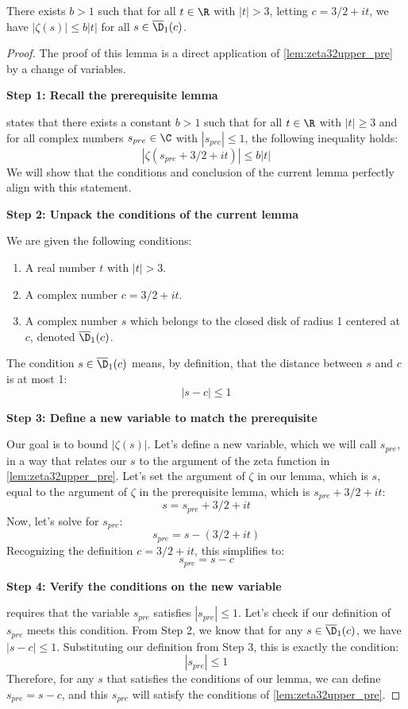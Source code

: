 \begin{lemma}\label{lem:zeta32upper}
 \leanok
There exists $b>1$ such that for all $t\in\R$ with $|t|>3$, letting $c=3/2+it$, we have $|\zeta(s)| \le b|t|$ for all $s\in\overline{\D}_1(c)$.
\end{lemma}
\begin{proof}
\leanok
{}
The proof of this lemma is a direct application of \cref{lem:zeta32upper_pre} by a change of variables.

\textbf{Step 1: Recall the prerequisite lemma}

 states that there exists a constant $b>1$ such that for all $t\in\R$ with $|t|\ge3$ and for all complex numbers $s_{pre}\in\C$ with $|s_{pre}|\le 1$, the following inequality holds:
$$ |\zeta(s_{pre}+3/2+it)| \le b|t| $$
We will show that the conditions and conclusion of the current lemma perfectly align with this statement.

\textbf{Step 2: Unpack the conditions of the current lemma}

We are given the following conditions:
\begin{enumerate}
    \item A real number $t$ with $|t| > 3$.
    \item A complex number $c = 3/2 + it$.
    \item A complex number $s$ which belongs to the closed disk of radius 1 centered at $c$, denoted $\overline{\D}_1(c)$.
\end{enumerate}
The condition $s \in \overline{\D}_1(c)$ means, by definition, that the distance between $s$ and $c$ is at most 1:
$$ |s - c| \le 1 $$

\textbf{Step 3: Define a new variable to match the prerequisite}

Our goal is to bound $|\zeta(s)|$. Let's define a new variable, which we will call $s_{pre}$, in a way that relates our $s$ to the argument of the zeta function in \cref{lem:zeta32upper_pre}.
Let's set the argument of $\zeta$ in our lemma, which is $s$, equal to the argument of $\zeta$ in the prerequisite lemma, which is $s_{pre}+3/2+it$:
$$ s = s_{pre} + 3/2 + it $$
Now, let's solve for $s_{pre}$:
$$ s_{pre} = s - (3/2 + it) $$
Recognizing the definition $c=3/2+it$, this simplifies to:
$$ s_{pre} = s - c $$

\textbf{Step 4: Verify the conditions on the new variable}

 requires that the variable $s_{pre}$ satisfies $|s_{pre}| \le 1$. Let's check if our definition of $s_{pre}$ meets this condition.
From Step 2, we know that for any $s \in \overline{\D}_1(c)$, we have $|s - c| \le 1$.
Substituting our definition from Step 3, this is exactly the condition:
$$ |s_{pre}| \le 1 $$
Therefore, for any $s$ that satisfies the conditions of our lemma, we can define $s_{pre} = s-c$, and this $s_{pre}$ will satisfy the conditions of \cref{lem:zeta32upper_pre}.


\end{proof}

